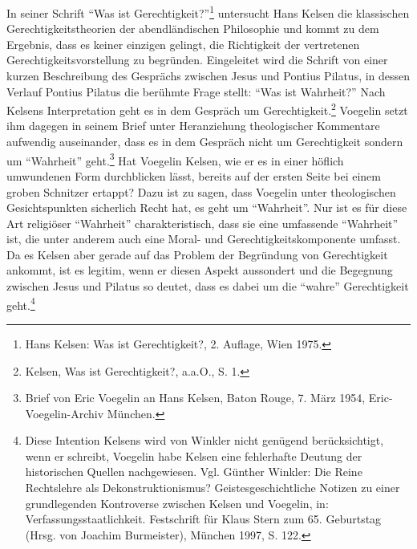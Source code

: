 \documentclass[12pt,a4paper,ngerman]{article}
\begin{document}
In seiner Schrift "`Was ist Gerechtigkeit?"'\footnote{Hans Kelsen: Was
  ist Gerechtigkeit?, 2. Auflage, Wien 1975.} untersucht Hans Kelsen
die klassischen Gerechtigkeitstheorien der abendländischen Philosophie
und kommt zu dem Ergebnis, dass es keiner einzigen gelingt, die
Richtigkeit der vertretenen Gerechtigkeitsvorstellung zu begründen.
Eingeleitet wird die Schrift von einer kurzen Beschreibung des
Gesprächs zwischen Jesus und Pontius Pilatus, in dessen Verlauf
Pontius Pilatus die berühmte Frage stellt: "`Was ist Wahrheit?"' Nach
Kelsens Interpretation geht es in dem Gespräch um
Gerechtigkeit.\footnote{Kelsen, Was ist Gerechtigkeit?, a.a.O., S. 1.}
Voegelin setzt ihm dagegen in seinem Brief unter Heranziehung
theologischer Kommentare aufwendig auseinander, dass es in dem
Gespräch nicht um Gerechtigkeit sondern um "`Wahrheit"'
geht.\footnote{Brief von Eric Voegelin an Hans Kelsen, Baton Rouge, 7.
  März 1954, Eric-Voegelin-Archiv München.} Hat Voegelin Kelsen, wie
er es in einer höflich umwundenen Form durchblicken lässt, bereits auf
der ersten Seite bei einem groben Schnitzer ertappt? Dazu ist zu
sagen, dass Voegelin unter theologischen Gesichtspunkten sicherlich
Recht hat, es geht um "`Wahrheit"'. Nur ist es für diese Art
religiöser "`Wahrheit"' charakteristisch, dass sie eine umfassende
"`Wahrheit"' ist, die unter anderem auch eine Moral- und
Gerechtigkeitskomponente umfasst. Da es Kelsen aber gerade auf das
Problem der Begründung von Gerechtigkeit ankommt, ist es legitim, wenn
er diesen Aspekt aussondert und die Begegnung zwischen Jesus und
Pilatus so deutet, dass es dabei um die "`wahre"' Gerechtigkeit
geht.\footnote{Diese Intention Kelsens wird von Winkler nicht genügend
  berücksichtigt, wenn er schreibt, Voegelin habe Kelsen eine
fehlerhafte
  Deutung der historischen Quellen nachgewiesen. Vgl. Günther Winkler:
  Die Reine Rechtslehre als Dekonstruktionismus?
  Geistesgeschichtliche Notizen zu einer grundlegenden Kontroverse
  zwischen Kelsen und Voegelin, in: Verfassungsstaatlichkeit.
  Festschrift für Klaus Stern zum 65.  Geburtstag (Hrsg. von Joachim
  Burmeister), München 1997, S. 122.}
\end{document}

